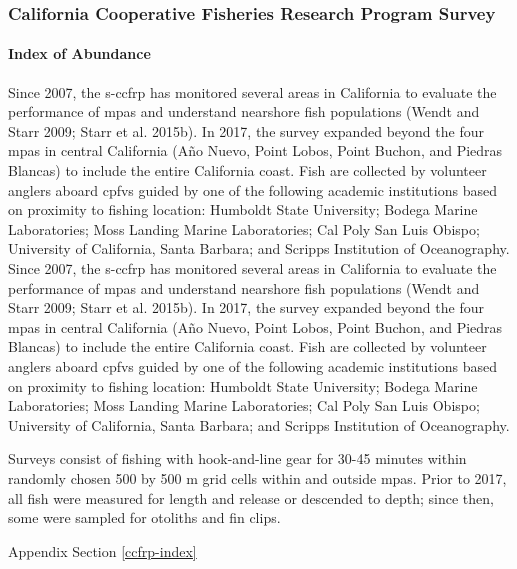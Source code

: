 \documentclass[11pt,
  english,
  letterpaper,
]{article}
\begin{document}
\hypertarget{california-cooperative-fisheries-research-program-survey}{%
\subsubsection{California Cooperative Fisheries Research Program Survey}\label{california-cooperative-fisheries-research-program-survey}}

\hypertarget{index-of-abundance}{%
\paragraph{Index of Abundance}\label{index-of-abundance}}

\hfill\break

Since 2007, the \gls{s-ccfrp} has monitored several areas in California to evaluate the performance of \glspl{mpa} and understand nearshore fish populations (Wendt and Starr 2009; Starr et al. 2015b). In 2017, the survey expanded beyond the four \Gls{mpa}s in central California (Año Nuevo, Point Lobos, Point Buchon, and Piedras Blancas) to include the entire California coast. Fish are collected by volunteer anglers aboard \glspl{cpfv} guided by one of the following academic institutions based on proximity to fishing location: Humboldt State University; Bodega Marine Laboratories; Moss Landing Marine Laboratories; Cal Poly San Luis Obispo; University of California, Santa Barbara; and Scripps Institution of Oceanography. Since 2007, the \gls{s-ccfrp} has monitored several areas in California to evaluate the performance of \glspl{mpa} and understand nearshore fish populations (Wendt and Starr 2009; Starr et al. 2015b). In 2017, the survey expanded beyond the four \Gls{mpa}s in central California (Año Nuevo, Point Lobos, Point Buchon, and Piedras Blancas) to include the entire California coast. Fish are collected by volunteer anglers aboard \glspl{cpfv} guided by one of the following academic institutions based on proximity to fishing location: Humboldt State University; Bodega Marine Laboratories; Moss Landing Marine Laboratories; Cal Poly San Luis Obispo; University of California, Santa Barbara; and Scripps Institution of Oceanography.

Surveys consist of fishing with hook-and-line gear for 30-45 minutes within randomly chosen 500 by 500 m grid cells within and outside \glspl{mpa}. Prior to 2017, all fish were measured for length and release or descended to depth; since then, some were sampled for otoliths and fin clips.

Appendix Section \ref{ccfrp-index}
\end{document}
